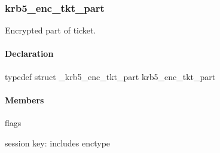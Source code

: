 \documentclass[letterpaper,10pt,english]{sphinxmanual}
\begin{document}
\subsubsection{krb5\_enc\_tkt\_part}
\label{appdev/refs/types/krb5_enc_tkt_part:krb5-enc-tkt-part}\label{appdev/refs/types/krb5_enc_tkt_part::doc}\label{appdev/refs/types/krb5_enc_tkt_part:krb5-enc-tkt-part-struct}

\begin{fulllineitems}
\label{appdev/refs/types/krb5_enc_tkt_part:c.krb5_enc_tkt_part}
\end{fulllineitems}


Encrypted part of ticket.


\paragraph{Declaration}
\label{appdev/refs/types/krb5_enc_tkt_part:declaration}
typedef struct \_krb5\_enc\_tkt\_part  krb5\_enc\_tkt\_part


\paragraph{Members}
\label{appdev/refs/types/krb5_enc_tkt_part:members}

\begin{fulllineitems}
\label{appdev/refs/types/krb5_enc_tkt_part:c.krb5_enc_tkt_part.magic}
\end{fulllineitems}


\begin{fulllineitems}
\label{appdev/refs/types/krb5_enc_tkt_part:c.krb5_enc_tkt_part.flags}
flags

\end{fulllineitems}


\begin{fulllineitems}
\label{appdev/refs/types/krb5_enc_tkt_part:c.krb5_enc_tkt_part.session}
session key: includes enctype

\end{fulllineitems}
\end{document}

